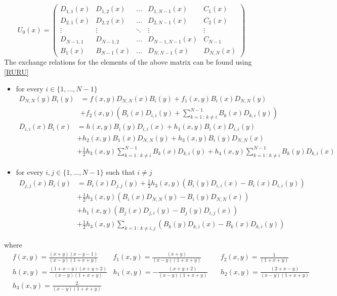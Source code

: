 \documentclass[10pt]{article}
\numberwithin{equation}{section}
\numberwithin{equation}{subsection}
\begin{document}
\begin{equation}
	U_{0}(x)=\begin{pmatrix}
		D_{1,1}(x)&D_{1,2}(x)&\ldots&D_{1,N-1}(x)&C_{1}(x)\\
		D_{2,1}(x)&D_{2,2}(x)&\ldots&D_{2,N-1}(x)&C_{2}(x)\\
		\vdots&\vdots&\ddots&\vdots&\vdots\\
		D_{N-1,1}&D_{N-1,2}&\ldots&D_{N-1,N-1}(x)&C_{N-1}\\
		B_{1}(x)&B_{N-1}(x)&\ldots&D_{N,N-1}(x)&D_{N,N}(x)
	\end{pmatrix}
\end{equation}
The exchange relations for the elements of the above matrix can be found using \eqref{RURU}
\begin{itemize}
	\item for every $i\in\{1,\ldots,N-1\}$
	\begin{equation}\label{EX1}
		\begin{split}
			D_{N,N}(y)B_{i}(y)&=f(x,y)D_{N,N}(x)B_{i}(y)+f_{1}(x,y)B_{i}(x)D_{N,N}(y)\\&+f_{2}(x,y)\left(B_{i}(x)D_{i,i}(y)+\sum_{k=1\,:\,k\neq i}^{N-1}B_{k}(x)D_{k,i}(y)\right)
		\end{split}	
	\end{equation}
	\begin{equation}\label{EX2}
		\begin{split}
			D_{i,i}(x)B_{i}(x)&=h(x,y)B_{i}(y)D_{i,i}(x)+h_{1}(x,y)B_{i}(x)D_{i,i}(y)\\&+h_{2}(x,y)B_{1}(x)D_{N,N}(y)+h_{3}(x,y)B_{i}(y)D_{N,N}(x)\\&+\frac{1}{2}h_{3}(x,y)\sum_{k=1\,:\, k\neq i}^{N-1}B_{k}(x)D_{k,i}(y)+h_{4}(x,y)\sum_{k=1\,:\, k\neq i}^{N-1}B_{k}(y)D_{k,i}(x)
		\end{split}
	\end{equation}
	\item  for every $i,j\in \{1,\ldots,N-1\}$ such that $i\neq j$
	\begin{equation}\label{EX3}
		\begin{split}
			D_{j,j}(x)B_{i}(y)&=B_{i}(x)D_{j,j}(y)+\frac{1}{2}h_{3}(x,y)\left(B_{i}(y)D_{i,i}(x)-B_{i}(x)D_{i,i}(y)\right)
			\\&+
			\frac{1}{2}h_{3}(x,y)\left(B_{i}(x)D_{N,N}(y)-B_{i}(y)D_{N,N}(x)\right)
			\\&+
			h_{1}(x,y)\left(B_{j}(x)D_{j,i}(y)-B_{j}(y)D_{i,j}(x)\right)
			\\&+
			\frac{1}{2}h_{3}(x,y)\sum_{k=1\,:\,k\neq i,j}\left(B_{k}(y)D_{k,i}(x)-B_{k}(x)D_{k,i}(y)\right)
		\end{split}
	\end{equation}
	
\end{itemize}
where
\begin{align}
	&f(x,y)=\frac{(x+y)(x-y-1)}{(x-y)(1+x+y)}&f_{1}(x,y)=\frac{(x+y)}{(x-y)(1+x+y)}\quad&f_{2}(x,y)=\frac{1}{(1+x+y)}\nonumber\\&h(x,y)=\frac{(1+x-y)(x+y+2)}{(x-y)(1+x+y)}
	&h_{1}(x,y)=-\frac{(x+y+2)}{(x-y)(1+x+y)}\quad&h_{2}(x,y)=\frac{(2+x-y)}{(x-y)(1+x+y)}\nonumber
	\\&h_{3}(x,y)=\frac{2}{(x-y)(1+x+y)}
\end{align}
\end{document}
